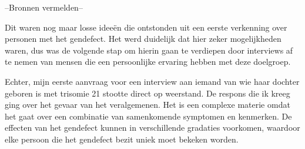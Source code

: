--Bronnen vermelden--

Dit waren nog maar losse ideeën die ontstonden uit een eerste verkenning over personen met het gendefect. Het werd duidelijk dat hier zeker mogelijkheden waren, dus was de volgende stap om hierin gaan te verdiepen door interviews af te nemen van mensen die een persoonlijke ervaring hebben met deze doelgroep.

Echter, mijn eerste aanvraag voor een interview aan iemand van wie haar dochter geboren is met trisomie 21 stootte direct op weerstand. De respons die ik kreeg ging over het gevaar van het veralgemenen. Het is een complexe materie omdat het gaat over een combinatie van samenkomende symptomen en kenmerken. De effecten van het gendefect kunnen in verschillende gradaties voorkomen, waardoor elke persoon die het gendefect bezit uniek moet bekeken worden.